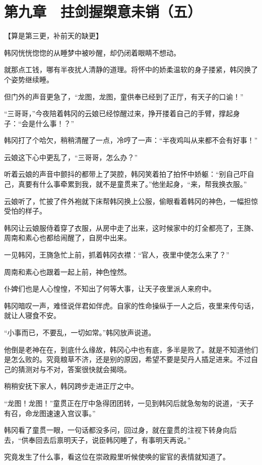 \section{第九章　拄剑握槊意未销（五）}

【算是第三更，补前天的缺更】

韩冈恍恍惚惚的从睡梦中被吵醒，却仍闭着眼睛不想动。

就那点工钱，哪有半夜扰人清静的道理。将怀中的娇柔温软的身子搂紧，韩冈换了个姿势继续睡。

但门外的声音更急了，“龙图，龙图，童供奉已经到了正厅，有天子的口谕！”

“三哥哥，”今夜陪着韩冈的云娘已经惊醒过来，挣开搂着自己的手臂，撑起身子：“会是什么事！？”

韩冈打了个哈欠，稍稍清醒了一点，冷哼了一声：“半夜鸡叫从来都不会有好事！”

云娘这下心中更乱了，“三哥哥，怎么办？”

听着云娘的声音中颤抖的都带上了哭腔，韩冈笑着拍了拍怀中娇躯：“别自己吓自己，真要有什么事牵累到我，就不是童贯来了。”他坐起身，“来，帮我换衣服。”

云娘听了，忙披了件外袍就下床帮韩冈换上公服，偷眼看着韩冈的神色，一幅担惊受怕的样子。

韩冈让云娘服侍着穿了衣服，从房中走了出来，这时候家中的灯全都亮了，王旖、周南和素心也都给闹醒了，自房中出来。

一见韩冈，王旖急忙上前，抓着韩冈衣襟：“官人，夜里中使怎么来了？”

周南和素心也跟着一起上前，神色惶然。

仆婢们也是人心惶惶，不知出了何等大事，让天子夜里派人来府中。

韩冈暗叹一声，难怪说伴君如伴虎。自家的性命操纵于一人之后，夜里来传句话，就让人寝食不安。

“小事而已，不要乱，一切如常。”韩冈放声说道。

他倒是老神在在，到底什么缘故，韩冈心中也有底，多半是败了。就是不知道他们是怎么败的。究竟粮草不济，还是别的原因，希望不要是契丹人插足进来。不过自己的猜测对与不对，答案很快就会揭晓。

稍稍安抚下家人，韩冈跨步走进正厅之中。

“龙图！龙图！”童贯正在厅中急得团团转，一见到韩冈后就急匆匆的说道，“天子有召，命龙图速速入宫议事。”

韩冈看了童贯一眼，一句话都没多问，回过身，就在童贯的注视下转身向后去，“供奉回去后禀明天子，说臣韩冈睡了，有事明天再说。”

究竟发生了什么事，看这位在崇政殿里听候使唤的宦官的表情就知道了。

